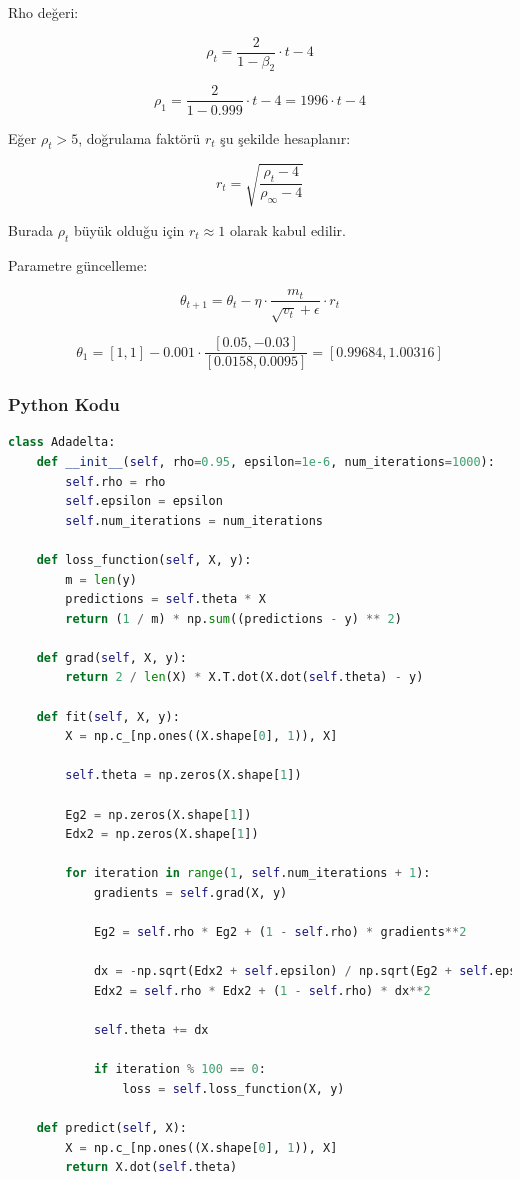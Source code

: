 Rho değeri:

\[ \rho_t = \frac{2}{1 - \beta_2} \cdot t - 4 \]

\[ \rho_1 = \frac{2}{1 - 0.999} \cdot t - 4 = 1996 \cdot t - 4 \]

Eğer $\rho_t > 5$, doğrulama faktörü $r_t$ şu şekilde hesaplanır:

\[ r_t = \sqrt{\frac{\rho_t - 4}{\rho_\infty - 4}} \]

Burada $\rho_t$ büyük olduğu için $r_t \approx 1$ olarak kabul edilir.

Parametre güncelleme:

\[ \theta_{t+1} = \theta_t - \eta \cdot \frac{m_t}{\sqrt{v_t} + \epsilon} \cdot r_t \]

\[ \theta_1 = [1, 1] - 0.001 \cdot \frac{[0.05, -0.03]}{[0.0158, 0.0095]} = [0.99684, 1.00316] \]

\subsubsection{Python Kodu}

\begin{lstlisting}[language=Python]
class Adadelta:
    def __init__(self, rho=0.95, epsilon=1e-6, num_iterations=1000):
        self.rho = rho
        self.epsilon = epsilon
        self.num_iterations = num_iterations

    def loss_function(self, X, y):
        m = len(y)
        predictions = self.theta * X
        return (1 / m) * np.sum((predictions - y) ** 2)

    def grad(self, X, y):
        return 2 / len(X) * X.T.dot(X.dot(self.theta) - y)    

    def fit(self, X, y):
        X = np.c_[np.ones((X.shape[0], 1)), X]

        self.theta = np.zeros(X.shape[1])

        Eg2 = np.zeros(X.shape[1])
        Edx2 = np.zeros(X.shape[1])

        for iteration in range(1, self.num_iterations + 1):
            gradients = self.grad(X, y)

            Eg2 = self.rho * Eg2 + (1 - self.rho) * gradients**2

            dx = -np.sqrt(Edx2 + self.epsilon) / np.sqrt(Eg2 + self.epsilon) * gradients
            Edx2 = self.rho * Edx2 + (1 - self.rho) * dx**2

            self.theta += dx

            if iteration % 100 == 0:
                loss = self.loss_function(X, y)

    def predict(self, X):
        X = np.c_[np.ones((X.shape[0], 1)), X]
        return X.dot(self.theta)
\end{lstlisting}


